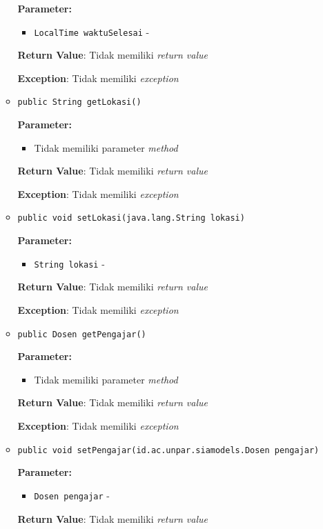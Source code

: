 \documentclass{article}
\begin{document}
\begin{enumerate}
\begin{itemize}
\textbf{Parameter:}
\begin{itemize}
\item \texttt{LocalTime waktuSelesai} - 
\end{itemize}
\textbf{Return Value}: Tidak memiliki \textit{return value}

\textbf{Exception}: Tidak memiliki \textit{exception}

\item \texttt{public String getLokasi()}



\textbf{Parameter:}
\begin{itemize}
\item Tidak memiliki parameter \textit{method}
\end{itemize}
\textbf{Return Value}: Tidak memiliki \textit{return value}

\textbf{Exception}: Tidak memiliki \textit{exception}

\item \texttt{public void setLokasi(java.lang.String lokasi)}



\textbf{Parameter:}
\begin{itemize}
\item \texttt{String lokasi} - 
\end{itemize}
\textbf{Return Value}: Tidak memiliki \textit{return value}

\textbf{Exception}: Tidak memiliki \textit{exception}

\item \texttt{public Dosen getPengajar()}



\textbf{Parameter:}
\begin{itemize}
\item Tidak memiliki parameter \textit{method}
\end{itemize}
\textbf{Return Value}: Tidak memiliki \textit{return value}

\textbf{Exception}: Tidak memiliki \textit{exception}

\item \texttt{public void setPengajar(id.ac.unpar.siamodels.Dosen pengajar)}



\textbf{Parameter:}
\begin{itemize}
\item \texttt{Dosen pengajar} - 
\end{itemize}
\textbf{Return Value}: Tidak memiliki \textit{return value}


\end{itemize}
\end{enumerate}
\end{document}
